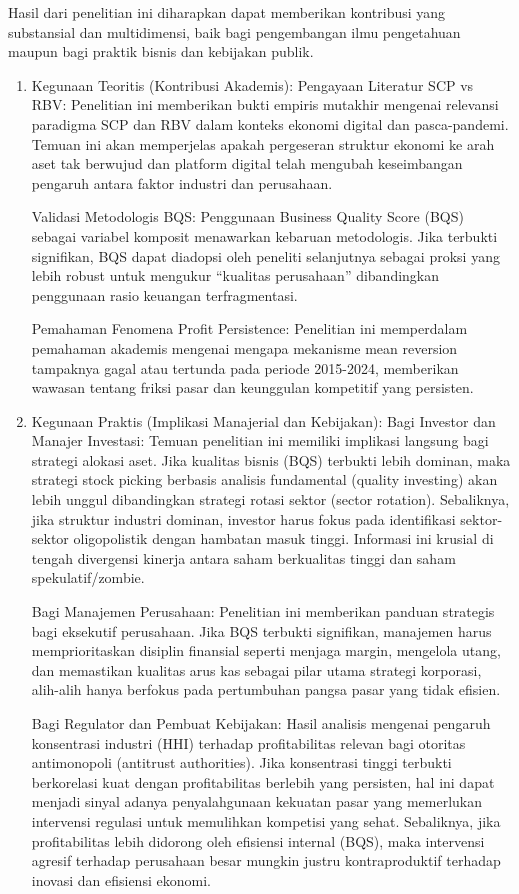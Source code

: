 \documentclass[12pt,a4paper]{report}
\begin{document}
Hasil dari penelitian ini diharapkan dapat memberikan kontribusi yang
substansial dan multidimensi, baik bagi pengembangan ilmu pengetahuan
maupun bagi praktik bisnis dan kebijakan publik.

\begin{enumerate}
\def\labelenumi{\arabic{enumi}.}
\item
  Kegunaan Teoritis (Kontribusi Akademis): Pengayaan Literatur SCP vs
  RBV: Penelitian ini memberikan bukti empiris mutakhir mengenai
  relevansi paradigma SCP dan RBV dalam konteks ekonomi digital dan
  pasca-pandemi. Temuan ini akan memperjelas apakah pergeseran struktur
  ekonomi ke arah aset tak berwujud dan platform digital telah mengubah
  keseimbangan pengaruh antara faktor industri dan perusahaan.

  Validasi Metodologis BQS: Penggunaan Business Quality Score (BQS)
  sebagai variabel komposit menawarkan kebaruan metodologis. Jika
  terbukti signifikan, BQS dapat diadopsi oleh peneliti selanjutnya
  sebagai proksi yang lebih robust untuk mengukur ``kualitas
  perusahaan'' dibandingkan penggunaan rasio keuangan terfragmentasi.

  Pemahaman Fenomena Profit Persistence: Penelitian ini memperdalam
  pemahaman akademis mengenai mengapa mekanisme mean reversion tampaknya
  gagal atau tertunda pada periode 2015-2024, memberikan wawasan tentang
  friksi pasar dan keunggulan kompetitif yang persisten.
\item
  Kegunaan Praktis (Implikasi Manajerial dan Kebijakan): Bagi Investor
  dan Manajer Investasi: Temuan penelitian ini memiliki implikasi
  langsung bagi strategi alokasi aset. Jika kualitas bisnis (BQS)
  terbukti lebih dominan, maka strategi stock picking berbasis analisis
  fundamental (quality investing) akan lebih unggul dibandingkan
  strategi rotasi sektor (sector rotation). Sebaliknya, jika struktur
  industri dominan, investor harus fokus pada identifikasi sektor-sektor
  oligopolistik dengan hambatan masuk tinggi. Informasi ini krusial di
  tengah divergensi kinerja antara saham berkualitas tinggi dan saham
  spekulatif/zombie.

  Bagi Manajemen Perusahaan: Penelitian ini memberikan panduan strategis
  bagi eksekutif perusahaan. Jika BQS terbukti signifikan, manajemen
  harus memprioritaskan disiplin finansial seperti menjaga margin,
  mengelola utang, dan memastikan kualitas arus kas sebagai pilar utama
  strategi korporasi, alih-alih hanya berfokus pada pertumbuhan pangsa
  pasar yang tidak efisien.

  Bagi Regulator dan Pembuat Kebijakan: Hasil analisis mengenai pengaruh
  konsentrasi industri (HHI) terhadap profitabilitas relevan bagi
  otoritas antimonopoli (antitrust authorities). Jika konsentrasi tinggi
  terbukti berkorelasi kuat dengan profitabilitas berlebih yang
  persisten, hal ini dapat menjadi sinyal adanya penyalahgunaan kekuatan
  pasar yang memerlukan intervensi regulasi untuk memulihkan kompetisi
  yang sehat. Sebaliknya, jika profitabilitas lebih didorong oleh
  efisiensi internal (BQS), maka intervensi agresif terhadap perusahaan
  besar mungkin justru kontraproduktif terhadap inovasi dan efisiensi
  ekonomi.
\end{enumerate}
\end{document}
